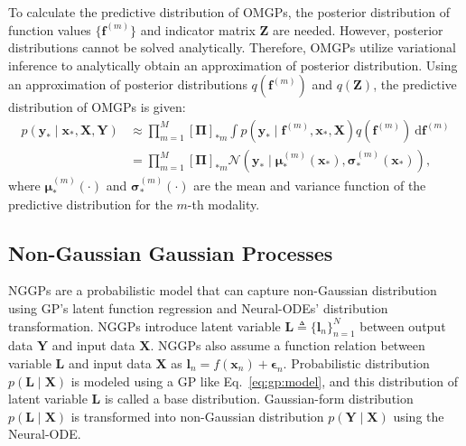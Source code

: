 \documentclass[sn-mathphys-num]{sn-jnl}
\begin{document}
To calculate the predictive distribution of OMGPs, the posterior distribution of function values $\{\mathbf f^{(m)}\}$ and indicator matrix $\mathbf Z$ are needed.
However, posterior distributions cannot be solved analytically.
Therefore, OMGPs utilize variational inference to analytically obtain an approximation of posterior distribution.
Using an approximation of posterior distributions $q(\mathbf f^{(m)})$ and $q(\mathbf Z)$, the predictive distribution of OMGPs is given:
\begin{align}\label{eq:OM-GPs:prediction}
    p(\mathbf{y}_* \mid \mathbf{x}_*, \mathbf{X}, \mathbf{Y}) &\approx 
    \prod^{M}_{m=1} \left[\boldsymbol{\Pi}\right]_{*m} \int p(\mathbf{y}_* \mid \mathbf{f}^{(m)}, \mathbf{x}_*, \mathbf{X}) q(\mathbf{f}^{(m)}) ~ \mathrm{d} \mathbf{f}^{(m)} \nonumber \\
    &= \prod^{M}_{m=1} \left[\boldsymbol{\Pi}\right]_{*m} \mathcal{N}(\mathbf{y}_* \mid \boldsymbol{\mu}_*^{(m)}(\mathbf x_*), \boldsymbol{\sigma}_*^{(m)}(\mathbf x_*)),
\end{align}
where $\boldsymbol{\mu}_*^{(m)}(\cdot)$ and $\boldsymbol{\sigma}_*^{(m)}(\cdot)$ are the mean and variance function of the predictive distribution for the $m$-th modality.

\subsection{Non-Gaussian Gaussian Processes}
NGGPs \cite{sendera2021non} are a probabilistic model that can capture non-Gaussian distribution using GP's latent function regression and Neural-ODEs' distribution transformation.
NGGPs introduce latent variable $\mathbf L\triangleq\{\mathbf{l}_n\}_{n=1}^{N}$ between output data $\mathbf Y$ and input data $\mathbf X$.
NGGPs also assume a function relation between variable $\mathbf L$ and input data $\mathbf X$ as $\mathbf{l}_n = f(\mathbf{x}_n)+\boldsymbol{\epsilon}_n$.
Probabilistic distribution $p(\mathbf L\mid \mathbf X)$ is modeled using a GP like Eq.~\ref{eq:gp:model}, and this distribution of latent variable $\mathbf L$ is called a base distribution.
Gaussian-form distribution $p(\mathbf L\mid \mathbf X)$ is transformed into non-Gaussian distribution $p(\mathbf Y\mid \mathbf X)$ using the Neural-ODE.
\end{document}
